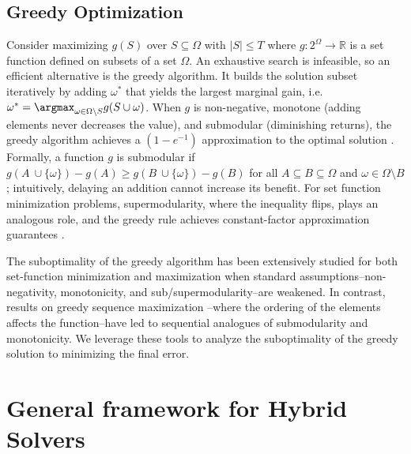 \documentclass{article}
\newcommand{\ambuj}[1]{\textcolor{red}{AT: #1}}
\begin{document}
\subsection{Greedy Optimization} \label{sec:bggreedy}

Consider maximizing $g(S)$ over $S\subseteq \Omega$ with $|S| \leq T$ where $g: 2^{\Omega} \to \mathbb{R}$ is a set function defined on subsets of a set $\Omega$. An exhaustive search is infeasible, so an efficient alternative is the greedy algorithm. It builds the solution subset iteratively by adding $\omega^*$ that yields the largest marginal gain, i.e. $\omega^* =  \argmax_{\omega \in \Omega \setminus S} g(S \cup \omega)$. When $g$ is non-negative, monotone (adding elements never decreases the value), and submodular (diminishing returns), the greedy algorithm achieves a $(1 - e^{-1})$ approximation to the optimal solution \citep{nemhauser1978analysis}. Formally, a function $g$ is submodular if $g(A \ \cup \{\omega\}) - g(A) \geq g(B \ \cup \{\omega\}) - g(B)$ for all $A \subseteq B \subseteq \Omega$ and $\omega \in \Omega \setminus B$; intuitively, delaying an addition cannot increase its benefit. For set function minimization problems, supermodularity, where the inequality flips, plays an analogous role, and the greedy rule achieves constant-factor approximation guarantees \citep{liberty2017greedy}.

The suboptimality of the greedy algorithm has been extensively studied for both set-function minimization \citep{bounia2023approximating}  and maximization \citep{das2018approximate,feige2011maximizing,bian2017guarantees,harshaw2019submodular} when standard assumptions--non-negativity, monotonicity, and sub/supermodularity--are weakened. In contrast, results on greedy sequence maximization \citep{streeter2008online,alaei2021maximizing,zhang2015string,bernardini2020through,van2024performance,tschiatschek2017selecting}--where the ordering of the elements affects the function--have led to sequential analogues of submodularity and monotonicity. We leverage these tools to analyze the suboptimality of the greedy solution to minimizing the final error.


\section{General framework for Hybrid Solvers} \label{sec:hybridframework}
\end{document}

